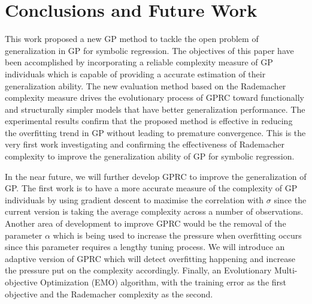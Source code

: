 \documentclass[conference]{IEEEtran}
\begin{document}
\section{Conclusions and Future Work}
\label{se:conclu}
This work proposed a new GP method to tackle the open problem of generalization in GP for symbolic regression. The objectives of this paper have been accomplished by incorporating a reliable complexity measure of GP individuals which is capable of providing a accurate estimation of their generalization ability. The new evaluation method based on the Rademacher complexity measure drives the evolutionary process of GPRC toward functionally and structurally simpler models that have better generalization performance. The experimental results confirm that the proposed method is effective in reducing the overfitting trend in GP without leading to premature convergence. This is the very first work  investigating and confirming the effectiveness of Rademacher complexity to improve the generalization ability of GP for symbolic regression.

In the near future, we will further develop GPRC to improve the generalization of GP. The first work is to have a more accurate measure of the complexity of GP individuals by using gradient descent to maximise the correlation with $\sigma$ since the current version is taking the average complexity across a number of observations. Another area of development to improve GPRC would be the removal of the parameter $\alpha$ which is being used to increase the pressure when overfitting occurs since this parameter requires a lengthy tuning process. We will introduce an adaptive version of GPRC which will detect overfitting happening and increase the pressure put on the complexity accordingly. Finally, an Evolutionary Multi-objective Optimization (EMO) algorithm, with the training error as the first objective and the Rademacher complexity as the second.


\end{document}

